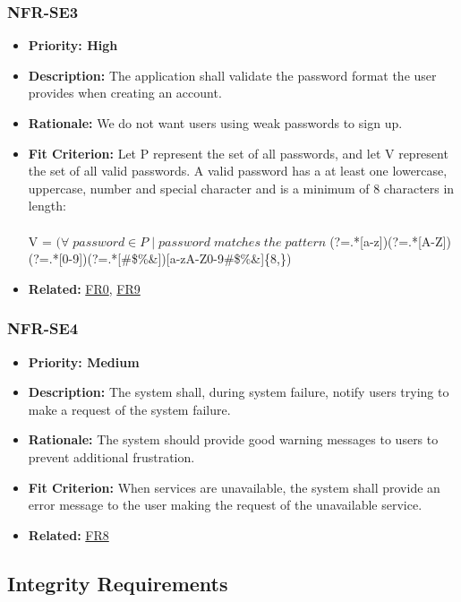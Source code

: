 \documentclass[12pt]{article}
\begin{document}
\subsubsection*{NFR-SE3}
\label{sec:SE3}
\begin{itemize}
  \item \textbf{Priority: High}
  \item \textbf{Description:} The application shall validate the password format the user provides when creating an account.
  \item \textbf{Rationale:} We do not want users using weak passwords to sign up.
  \item \textbf{Fit Criterion:} Let P represent the set of all passwords, and let V represent the set of all valid passwords. A valid password has a at least one lowercase, uppercase, number and special character and is a minimum of 8 characters in length:\\\\
  V = $(\forall\; password \in P\;  |\; password \; matches \; the \; pattern \; $(?=.*[a-z])(?=.*[A-Z])(?=.*[0-9])(?=.*[\#\$\%\&\*\@])[a-zA-Z0-9\#\$\%\&\*\@]\{8,\})\\
  \item \textbf{Related:} \hyperref[sec:FR0]{FR0}, \hyperref[sec:FR9]{FR9}
\end{itemize}
\subsubsection*{NFR-SE4}
\label{sec:SE4}
\begin{itemize}
  \item \textbf{Priority: Medium}
  \item \textbf{Description:} The system shall, during system failure, notify users trying to make a request of the system failure.
  \item \textbf{Rationale:} The system should provide good warning messages to users to prevent additional frustration.
  \item \textbf{Fit Criterion:} When services are unavailable, the system shall provide an error message to the user making the request of the unavailable service.
  \item \textbf{Related:} \hyperref[sec:FR8]{FR8}
\end{itemize}
\subsection{Integrity Requirements}
\end{document}
